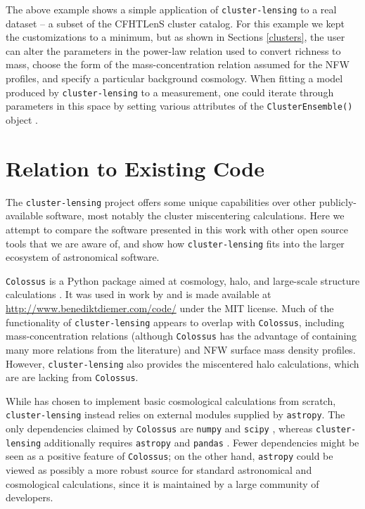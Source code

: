 \documentclass[twocolumn]{aastex6}
\newcommand{\code}{\lstinline[style=codeintext]}
\begin{document}
The above example shows a simple application of \code{cluster-lensing} to a real dataset -- a subset of the CFHTLenS cluster catalog.  For this example we kept the customizations to a minimum, but as shown in Sections \ref{clusters}, the user can alter the parameters in the power-law relation used to convert richness to mass, choose the form of the mass-concentration relation assumed for the NFW profiles, and specify a particular background cosmology. When fitting a model produced by \code{cluster-lensing} to a measurement, one could iterate through parameters in this space by setting various attributes of the \code{ClusterEnsemble()} object \citep[as done, e.g. in][]{Ford14, Ford15}.


\section{Relation to Existing Code}

The \code{cluster-lensing} project offers some unique capabilities over other publicly-available software, most notably the cluster miscentering calculations. Here we attempt to compare the software presented in this work with other open source tools that we are aware of, and show how \code{cluster-lensing} fits into the larger ecosystem of astronomical software. 

\code{Colossus} is a Python package aimed at cosmology, halo, and large-scale structure calculations \citep{ColossusCode}. It was used in work by \citet{Diemer15} and is made available at \url{http://www.benediktdiemer.com/code/} under the MIT license. Much of the functionality of \code{cluster-lensing} appears to overlap with \code{Colossus}, including mass-concentration relations (although \code{Colossus} has the advantage of containing many more relations from the literature) and NFW surface mass density profiles. However, \code{cluster-lensing} also provides the miscentered halo calculations, which are are lacking from \code{Colossus}.

While \citet{ColossusCode} has chosen to implement basic cosmological calculations from scratch, \code{cluster-lensing} instead relies on external modules supplied by \code{astropy}.  The only dependencies claimed by \code{Colossus} are \code{numpy} \citep{NumPy} and \code{scipy} \citep{SciPy}, whereas \code{cluster-lensing} additionally requires \code{astropy} \citep{astropy13} and \code{pandas} \citep{Pandas}. Fewer dependencies might be seen as a positive feature of \code{Colossus}; on the other hand, \code{astropy} could be viewed as possibly a more robust source for standard astronomical and cosmological calculations, since it is maintained by a large community of developers.
\end{document}
